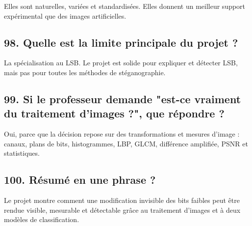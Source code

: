 \documentclass[11pt,a4paper]{article}
\begin{document}
Elles sont naturelles, variées et standardisées. Elles donnent un meilleur support expérimental que des images artificielles.

\subsection{98. Quelle est la limite principale du projet ?}

La spécialisation au LSB. Le projet est solide pour expliquer et détecter LSB, mais pas pour toutes les méthodes de stéganographie.

\subsection{99. Si le professeur demande "est-ce vraiment du traitement d'images ?", que répondre ?}

Oui, parce que la décision repose sur des transformations et mesures d'image : canaux, plans de bits, histogrammes, LBP, GLCM, différence amplifiée, PSNR et statistiques.

\subsection{100. Résumé en une phrase ?}

Le projet montre comment une modification invisible des bits faibles peut être rendue visible, mesurable et détectable grâce au traitement d'images et à deux modèles de classification.
\end{document}
